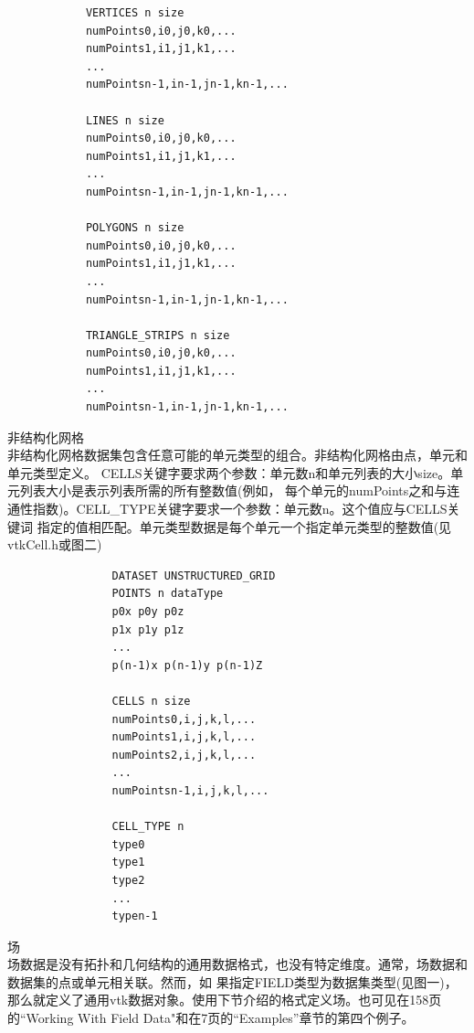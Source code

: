 \documentclass[UTF8]{ctexart}
\begin{document}
\begin{itemize}
{\begin{verbatim}
            VERTICES n size
            numPoints0,i0,j0,k0,...
            numPoints1,i1,j1,k1,... 
            ... 
            numPointsn-1,in-1,jn-1,kn-1,... 

            LINES n size 
            numPoints0,i0,j0,k0,...
            numPoints1,i1,j1,k1,... 
            ... 
            numPointsn-1,in-1,jn-1,kn-1,...

            POLYGONS n size 
            numPoints0,i0,j0,k0,...
            numPoints1,i1,j1,k1,... 
            ... 
            numPointsn-1,in-1,jn-1,kn-1,...

            TRIANGLE_STRIPS n size 
            numPoints0,i0,j0,k0,...
            numPoints1,i1,j1,k1,... 
            ... 
            numPointsn-1,in-1,jn-1,kn-1,...
        \end{verbatim}
        \item {
            非结构化网格 \\
            非结构化网格数据集包含任意可能的单元类型的组合。非结构化网格由点，单元和单元类型定义。
            CELLS关键字要求两个参数：单元数n和单元列表的大小size。单元列表大小是表示列表所需的所有整数值(例如，
            每个单元的numPoints之和与连通性指数)。CELL_TYPE关键字要求一个参数：单元数n。这个值应与CELLS关键词
            指定的值相匹配。单元类型数据是每个单元一个指定单元类型的整数值(见vtkCell.h或图二)
            \begin{verbatim}
                DATASET UNSTRUCTURED_GRID
                POINTS n dataType
                p0x p0y p0z
                p1x p1y p1z
                ...
                p(n-1)x p(n-1)y p(n-1)Z

                CELLS n size
                numPoints0,i,j,k,l,... 
                numPoints1,i,j,k,l,...
                numPoints2,i,j,k,l,... 
                ... 
                numPointsn-1,i,j,k,l,... 

                CELL_TYPE n
                type0
                type1
                type2
                ... 
                typen-1
            \end{verbatim}
        }
        \item{
            场 \\
            场数据是没有拓扑和几何结构的通用数据格式，也没有特定维度。通常，场数据和数据集的点或单元相关联。然而，如
            果指定FIELD类型为数据集类型(见图一)，那么就定义了通用vtk数据对象。使用下节介绍的格式定义场。也可见在158页的“Working
            With Field Data"和在7页的“Examples”章节的第四个例子。
        }
    }
\end{itemize}
\end{document}
